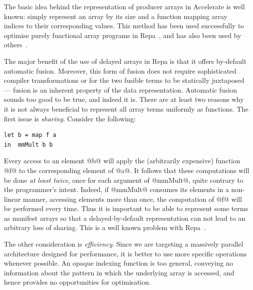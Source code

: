 The basic idea behind the representation of producer arrays in Accelerate is
well known: simply represent an array by its size and a function mapping array
indices to their corresponding values. This method has been used successfully to
optimise purely functional array programs in 
Repa~\cite{Keller:2010er}, and has also been used by
others~\cite{Claessen:2012hl}.

The major benefit of the use of delayed arrays in Repa is that it offers
by-default automatic fusion. Moreover, this form of fusion does not require
sophisticated compiler transformations or for the two fusible terms to be
statically juxtaposed --- fusion is an inherent property of the data
representation.
%
Automatic fusion sounds too good to be true, and indeed it is. There are at
least two reasons why it is not always beneficial to represent all array terms
uniformly as functions. The first issue is \emph{sharing}. Consider the
following:
%
\begin{lstlisting}[style=haskell]
let b = map f a
in  mmMult b b
\end{lstlisting}
%
Every access to an element @b@ will apply the (arbitrarily expensive) function
@f@ to the corresponding element of @a@. It follows that these computations will
be done \emph{at least twice}, once for each argument of @mmMult@, quite
contrary to the programmer's intent. Indeed, if @mmMult@ consumes its elements
in a non-linear manner, accessing elements more than once, the computation of
@f@ will be performed every time. Thus it is important to be able to represent
some terms as manifest arrays so that a delayed-by-default representation can
not lead to an arbitrary loss of sharing. This is a well known problem with
Repa~\cite{Lippmeier:2012gx}.

The other consideration is \emph{efficiency}. Since we are targeting a massively
parallel architecture designed for performance, it is better to use more
specific operations whenever possible. An opaque indexing function is too
general, conveying no information about the pattern in which the underlying
array is accessed, and hence provides no opportunities for optimisation.

